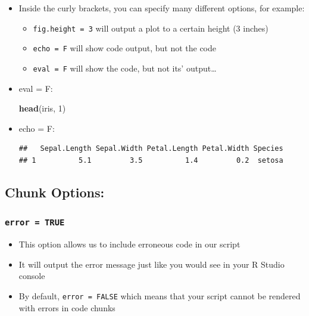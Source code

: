 \documentclass[
]{book}
\newenvironment{Shaded}{\begin{snugshade}}{\end{snugshade}}
\newcommand{\DecValTok}[1]{\textcolor[rgb]{0.00,0.00,0.81}{#1}}
\newcommand{\FunctionTok}[1]{\textcolor[rgb]{0.13,0.29,0.53}{\textbf{#1}}}
\newcommand{\NormalTok}[1]{#1}
\providecommand{\tightlist}{%
  \setlength{\itemsep}{0pt}\setlength{\parskip}{0pt}}
\begin{document}
\begin{itemize}
\item
  Inside the curly brackets, you can specify many different options, for example:

  \begin{itemize}
  \tightlist
  \item
    \texttt{fig.height\ =\ 3} will output a plot to a certain height (3 inches)
  \item
    \texttt{echo\ =\ F} will show code output, but not the code
  \item
    \texttt{eval\ =\ F} will show the code, but not its' output\ldots{}
  \end{itemize}
\item
  eval = F:

\begin{Shaded}
\begin{Highlighting}[]
\FunctionTok{head}\NormalTok{(iris, }\DecValTok{1}\NormalTok{) }
\end{Highlighting}
\end{Shaded}
\item
  echo = F:

\begin{verbatim}
##   Sepal.Length Sepal.Width Petal.Length Petal.Width Species
## 1          5.1         3.5          1.4         0.2  setosa
\end{verbatim}
\end{itemize}

\subsection{Chunk Options:}\label{chunk-options-1}

\subsubsection{\texorpdfstring{\texttt{error\ =\ TRUE}}{error = TRUE}}\label{error-true}

\begin{itemize}
\tightlist
\item
  This option allows us to include erroneous code in our script
\item
  It will output the error message just like you would see in your R Studio console
\item
  By default, \texttt{error\ =\ FALSE} which means that your script cannot be rendered with errors in code chunks
\end{itemize}
\end{document}
